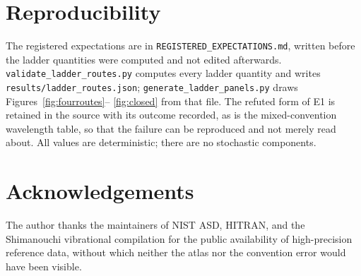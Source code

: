 \documentclass[11pt,a4paper]{article}
\theoremstyle{stmtstyle}
\theoremstyle{definition}
\theoremstyle{remark}
\begin{document}
\section*{Reproducibility}

The registered expectations are in \texttt{REGISTERED\_EXPECTATIONS.md},
written before the ladder quantities were computed and not edited
afterwards. \texttt{validate\_ladder\_routes.py} computes every ladder
quantity and writes \texttt{results/ladder\_routes.json};
\texttt{generate\_ladder\_panels.py} draws Figures~\ref{fig:fourroutes}--%
\ref{fig:closed} from that file. The refuted form of E1 is retained in the
source with its outcome recorded, as is the mixed-convention wavelength
table, so that the failure can be reproduced and not merely read about. All
values are deterministic; there are no stochastic components.

\section*{Acknowledgements}

The author thanks the maintainers of NIST ASD, HITRAN, and the Shimanouchi
vibrational compilation for the public availability of high-precision
reference data, without which neither the atlas nor the convention error
would have been visible.



\end{document}

